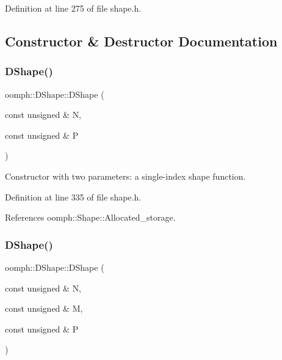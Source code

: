 Definition at line 275 of file shape.\+h.



\subsection{Constructor \& Destructor Documentation}
\mbox{\label{classoomph_1_1DShape_abeb261fc4fe276c22df040f8f754b151}} 
\subsubsection{\texorpdfstring{D\+Shape()}{DShape()}\hspace{0.1cm}{\footnotesize\ttfamily [1/4]}}
{\footnotesize\ttfamily oomph\+::\+D\+Shape\+::\+D\+Shape (\begin{DoxyParamCaption}\item[{const unsigned \&}]{N,  }\item[{const unsigned \&}]{P }\end{DoxyParamCaption})\hspace{0.3cm}{\ttfamily [inline]}}



Constructor with two parameters\+: a single-\/index shape function. 



Definition at line 335 of file shape.\+h.



References oomph\+::\+Shape\+::\+Allocated\+\_\+storage.

\mbox{\label{classoomph_1_1DShape_a9b448ecb15766d223b7cd4b668729174}} 
\subsubsection{\texorpdfstring{D\+Shape()}{DShape()}\hspace{0.1cm}{\footnotesize\ttfamily [2/4]}}
{\footnotesize\ttfamily oomph\+::\+D\+Shape\+::\+D\+Shape (\begin{DoxyParamCaption}\item[{const unsigned \&}]{N,  }\item[{const unsigned \&}]{M,  }\item[{const unsigned \&}]{P }\end{DoxyParamCaption})\hspace{0.3cm}{\ttfamily [inline]}}



